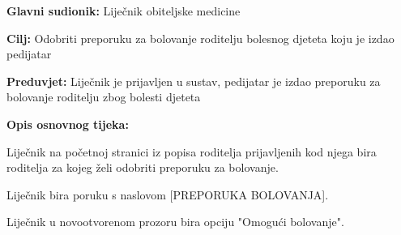 					\noindent {}
					\begin{packed_item}
						
						\item \textbf{Glavni sudionik: }Liječnik obiteljske medicine
						\item  \textbf{Cilj:} Odobriti preporuku za bolovanje roditelju bolesnog djeteta koju je izdao pedijatar
						\item  \textbf{Preduvjet:} Liječnik je prijavljen u sustav, pedijatar je izdao preporuku za bolovanje roditelju zbog bolesti djeteta
						\item  \textbf{Opis osnovnog tijeka:}
						
						\item[] \begin{packed_enum}
							
							\item Liječnik na početnoj stranici iz popisa roditelja prijavljenih kod njega bira roditelja za kojeg želi odobriti preporuku za bolovanje.
							\item Liječnik bira poruku s naslovom [PREPORUKA BOLOVANJA].
							\item Liječnik u novootvorenom prozoru bira opciju "Omogući bolovanje".
						\end{packed_enum}
						
						
						
					\end{packed_item}
					
